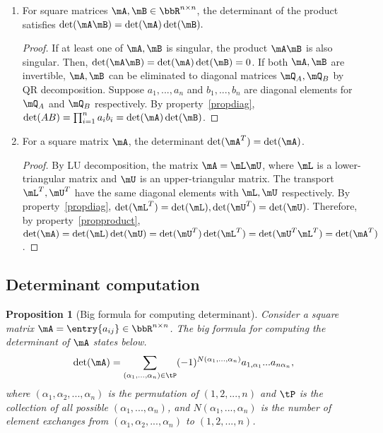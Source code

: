 \documentclass[11pt]{article}
\theoremstyle{plain}
\newtheorem{prop}{Proposition}
\theoremstyle{definition}
\begin{document}
\begin{enumerate}
	
	\item\label{propproduct} For square matrices $\mA, \mB \in \bbR^{n \times n}$, the determinant of the product satisfies $\det(\mA \mB) = \det(\mA) \det(\mB).$
	
	\begin{proof}
		If at least one of $\mA, \mB$ is singular, the product $\mA \mB$ is also singular. Then, $\det(\mA \mB) = \det(\mA) \det(\mB) = 0$. If both $\mA, \mB$ are invertible, $\mA, \mB$ can be eliminated to diagonal matrices $\mQ_{A}, \mQ_{B}$ by QR decomposition. Suppose $a_1,...,a_n$ and $b_1,...,b_n$ are diagonal elements for $\mQ_A$ and $\mQ_B$ respectively. By property~\ref{propdiag}, $\det(AB) = \prod_{i=1}^n a_i b_i = \det(\mA) \det(\mB)$. 
	\end{proof}
	
	\item\label{proptrans} For a square matrix $\mA$, the determinant $\det(\mA^T) = \det(\mA)$. 
	
	\begin{proof}
		By LU decomposition, the matrix $\mA = \mL \mU$, where $\mL$ is a lower-triangular matrix and $\mU$ is an upper-triangular matrix. The transport $\mL^T ,\mU^T$ have the same diagonal elements with $\mL, \mU$ respectively. By property~\ref{propdiag}, $\det(\mL^T)= \det(\mL),  \det(\mU^T) = \det(\mU)$. Therefore, by property~\ref{propproduct}, $\det(\mA) = \det(\mL) \det(\mU) = \det(\mU^T) \det(\mL^T) = \det(\mU^T \mL^T) = \det(\mA^T)$. 
			\end{proof}
\end{enumerate}

\subsection{Determinant computation}
\begin{prop}[Big formula for computing determinant]
	Consider a square matrix $\mA = \entry{a_{ij}} \in \bbR^{n \times n}$. The big formula for computing the determinant of $\mA$ states below.
	\[ \det(\mA) =  \sum_{(\alpha_1,...,\alpha_n) \in \tP} (-1)^{N(\alpha_1,...,\alpha_n)} a_{1,\alpha_1} ... a_{n \alpha_n},  \]
	where $(\alpha_1, \alpha_2, ...,\alpha_n)$ is the permutation of $(1,2,...,n)$ and $\tP$ is the collection of all possible  $(\alpha_1,...,\alpha_n)$, and $N(\alpha_1,...,\alpha_n)$ is the number of element exchanges from $(\alpha_1,\alpha_2,...,\alpha_n)$  to $(1,2,...,n)$. 
\end{prop}
\end{document}
